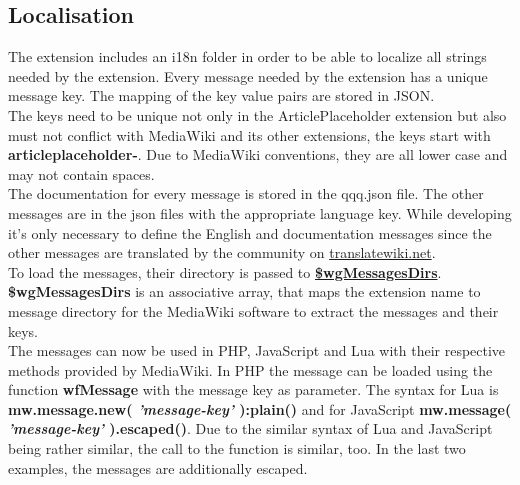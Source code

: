 \subsection{Localisation}

The extension includes an i18n folder in order to be able to localize all strings needed by the extension. Every message needed by the extension has a unique message key. The mapping of the key value pairs are stored in JSON. \\
The keys need to be unique not only in the ArticlePlaceholder extension but also must not conflict with MediaWiki and its other extensions, the keys start with \textbf{articleplaceholder-}. Due to MediaWiki conventions, they are all lower case and may not contain spaces.  \\
The documentation for every message is stored in the qqq.json file. The other messages are in the json files with the appropriate language key. While developing it's only necessary to define the English and documentation messages since the other messages are translated by the community on \href{https://translatewiki.net/}{translatewiki.net}. \\
To load the messages, their directory is passed to \href{https://www.mediawiki.org/wiki/Manual:$wgMessagesDirs}{\textbf{\$wgMessagesDirs}}. \textbf{\$wgMessagesDirs} is an associative array, that maps the extension name to message directory for the MediaWiki software to extract the messages and their keys. \\
The messages can now be used in PHP, JavaScript and Lua with their respective methods provided by MediaWiki. In PHP the message can be loaded using the function \textbf{wfMessage} with the message key as parameter. The syntax for Lua is \textbf{mw.message.new( \textit{'message-key'} ):plain()} and for JavaScript \textbf{mw.message( \textit{'message-key'} ).escaped()}. Due to the similar syntax of Lua and JavaScript being rather similar, the call to the function is similar, too. In the last two examples, the messages are additionally escaped.